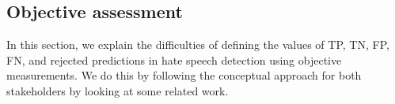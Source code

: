 



\subsection{Objective assessment}
\label{sec:objective-assessment}
%
%
%
%
%
%
%
%
%
%
%
%

In this section, we explain the difficulties of defining the values of TP, TN, FP, FN, and rejected predictions in hate speech detection using objective measurements.
%
We do this by following the conceptual approach for both stakeholders by looking at some related work.
%

